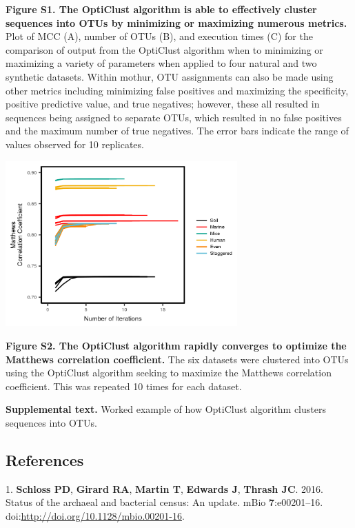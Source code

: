 \documentclass[11pt,]{article}
\begin{document}
\textbf{Figure S1. The OptiClust algorithm is able to effectively
cluster sequences into OTUs by minimizing or maximizing numerous
metrics.} Plot of MCC (A), number of OTUs (B), and execution times (C)
for the comparison of output from the OptiClust algorithm when to
minimizing or maximizing a variety of parameters when applied to four
natural and two synthetic datasets. Within mothur, OTU assignments can
also be made using other metrics including minimizing false positives
and maximizing the specificity, positive predictive value, and true
negatives; however, these all resulted in sequences being assigned to
separate OTUs, which resulted in no false positives and the maximum
number of true negatives. The error bars indicate the range of values
observed for 10 replicates.

\newpage

\includegraphics[width=3.5in]{results/figures/optimization.png}

\textbf{Figure S2. The OptiClust algorithm rapidly converges to optimize
the Matthews correlation coefficient.} The six datasets were clustered
into OTUs using the OptiClust algorithm seeking to maximize the Matthews
correlation coefficient. This was repeated 10 times for each dataset.

\newpage

\textbf{Supplemental text.} Worked example of how OptiClust algorithm
clusters sequences into OTUs.

\newpage

\subsection*{References}\label{references}

1. \textbf{Schloss PD}, \textbf{Girard RA}, \textbf{Martin T},
\textbf{Edwards J}, \textbf{Thrash JC}. 2016. Status of the archaeal and
bacterial census: An update. mBio \textbf{7}:e00201--16.
doi:\url{http://doi.org/10.1128/mbio.00201-16}.
\end{document}
